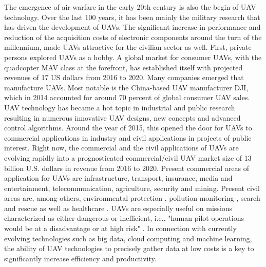 The emergence of air warfare in the early 20th century is also the begin of UAV technology.
Over the last 100 years, it has been mainly the military research that has driven the development of UAVs. \cite{Sifton2012}
The significant increase in performance and reduction of the acquisition costs of electronic components around the turn of the millennium,
made UAVs attractive for the civilian sector as well. \cite{Garcia2019} \cite{Chao2010}
First, private persons explored UAVs as a hobby. 
A global market for consumer UAVs, with the quadcopter MAV class at the forefront, 
has established itself with projected revenues of 17 US dollars from 2016 to 2020. \cite{Goldman}
Many companies emerged that manufacture UAVs. 
Most notable is the China-based UAV manufacturer DJI, which in 2014 accounted for around 70 percent of global consumer UAV sales. \cite{Weinswig2015}
UAV technology has became a hot topic in industrial and public research
resulting in numerous innovative UAV designs, new concepts and advanced control algorithms. \cite{Desjardins2016}
Around the year of 2015, this opened the door for UAVs to commercial applications in industry and civil applications in projects of public interest.
Right now, the commercial and the civil applications of UAVs are evolving rapidly 
into a prognosticated commercial/civil UAV market size of 13 billion U.S. dollars in revenue from 2016 to 2020. \cite{Goldman}
Present commercial areas of application for UAVs are
infrastructure, transport, insurance, media and entertainment, telecommunication, agriculture, security and mining. \cite{PwC2016}
Present civil areas are, among others, environmental protection \cite{Lei2019}, pollution monitoring \cite{Xiang2019}, 
search and rescue \cite{McCarthy2018} as well as healthcare \cite{PeoplesDaily2019}.
UAVs are especially  useful on missions characterized as either dangerous or inefficient, 
i.e., "human pilot operations would be at a disadvantage or at high risk" \cite{Watts2012}.
In connection with currently evolving technologies such as big data, cloud computing and machine learning,
the ability of UAV technologies to precisely gather data at low costs is a key to significantly increase efficiency and productivity. \cite{Garcia2019}

